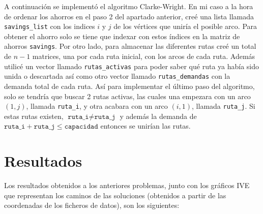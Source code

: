 \documentclass[a4paper,11pt]{article}
\begin{document}
A continuación se implementó el algoritmo Clarke-Wright. En mi caso a la hora de ordenar los ahorros en el paso 2 del apartado anterior, creé una lista llamada \texttt{savings\_list} con los indices ${i}$ y ${j}$ de los vértices que uniría el posible arco. Para obtener el ahorro solo se tiene que indexar con estos índices en la matriz de ahorros \texttt{savings}. Por otro lado, para almacenar las diferentes rutas creé un total de ${n-1}$ matrices, una por cada ruta inicial, con los arcos de cada ruta. Además utilicé un vector llamado \texttt{rutas\_activas} para poder saber qué ruta ya había sido unida o descartada así como otro vector llamado \texttt{rutas\_demandas} con la demanda total de cada ruta. Así para implementar el último paso del algoritmo, solo se tendría que buscar 2 rutas activas, las cuales una empezara con un arco ${(1,j)}$, llamada \texttt{ruta\_i}, y otra acabara con un arco ${(i,1)}$, llamada \texttt{ruta\_j}. Si estas rutas existen, ${\texttt{ruta\_i} \neq \texttt{ruta\_j}}$ y además la demanda de ${\texttt{ruta\_i} + \texttt{ruta\_j} \leq \texttt{capacidad}}$ entonces se unirían las rutas.


\section{Resultados}
Los resultados obtenidos a los anteriores problemas, junto con los gráficos IVE que representan los caminos de las soluciones (obtenidos a partir de las coordenadas de los ficheros de datos), son los siguientes:
\end{document}

